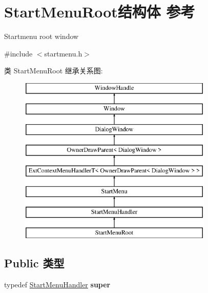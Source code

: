 \hypertarget{struct_start_menu_root}{}\section{Start\+Menu\+Root结构体 参考}
\label{struct_start_menu_root}


Startmenu root window  




{\ttfamily \#include $<$startmenu.\+h$>$}

类 Start\+Menu\+Root 继承关系图\+:\begin{figure}[H]
\begin{center}
\leavevmode
\includegraphics[height=8.000000cm]{struct_start_menu_root}
\end{center}
\end{figure}
\subsection*{Public 类型}
\begin{DoxyCompactItemize}
\item 
\mbox{\label{struct_start_menu_root_ada3d538ea2e028e1ca4d1d91bb8829b2}} 
typedef \hyperlink{struct_start_menu_handler}{Start\+Menu\+Handler} {\bfseries super}
\end{DoxyCompactItemize}
